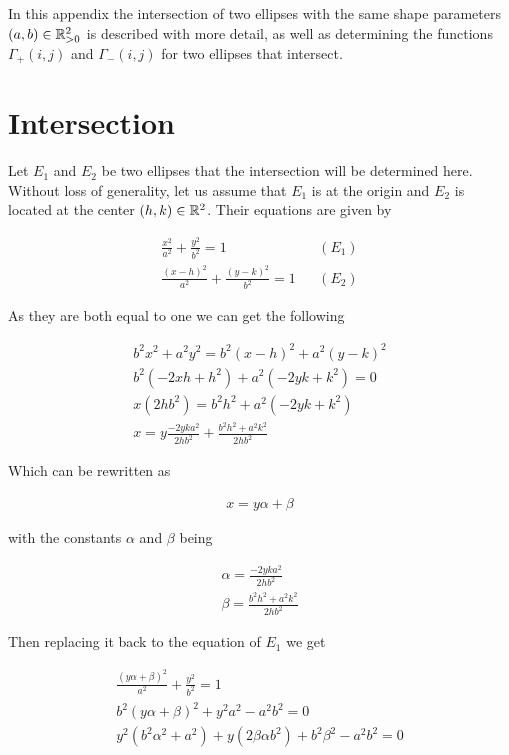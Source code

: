 In this appendix the intersection of two ellipses with the same shape parameters $(a,b) \in \mathbb{R}^2_{>0}$ is described with more detail, as well as determining the functions $\Gamma_+(i,j)$ and $\Gamma_-(i,j)$ for two ellipses that intersect.

\section{Intersection}

Let $E_1$ and $E_2$ be two ellipses that the intersection will be determined here. Without loss of generality, let us assume that $E_1$ is at the origin and $E_2$ is located at the center $(h,k) \in \mathbb{R}^2$. Their equations are given by

\begin{align*}
    \frac{x^2}{a^2} + \frac{y^2}{b^2} = 1 && (E_1)\\
    \frac{(x-h)^2}{a^2} + \frac{(y-k)^2}{b^2} = 1 && (E_2)
\end{align*}

As they are both equal to one we can get the following

\begin{align*}
    b^2x^2 + a^2y^2 = b^2(x-h)^2 + a^2(y-k)^2 \\
    b^2(-2xh + h^2) + a^2(-2yk + k^2) = 0\\
    x(2hb^2) = b^2h^2 + a^2(-2yk + k^2)\\
    x = y\frac{-2yka^2}{2hb^2} + \frac{b^2h^2 + a^2k^2}{2hb^2}
\end{align*}

Which can be rewritten as

\begin{align*}
    x = y\alpha + \beta
\end{align*}

with the constants $\alpha$ and $\beta$ being

\begin{align*}
    \alpha = \frac{-2yka^2}{2hb^2} \\
    \beta = \frac{b^2h^2 + a^2k^2}{2hb^2}
\end{align*}

Then replacing it back to the equation of $E_1$ we get

\begin{align*}
    \frac{(y\alpha + \beta)^2}{a^2} + \frac{y^2}{b^2} = 1\\
    b^2(y\alpha + \beta)^2 + y^2a^2 - a^2b^2 = 0\\
    y^2(b^2\alpha^2 + a^2) + y(2\beta\alpha b^2) + b^2\beta^2 -a^2b^2 = 0
\end{align*}

